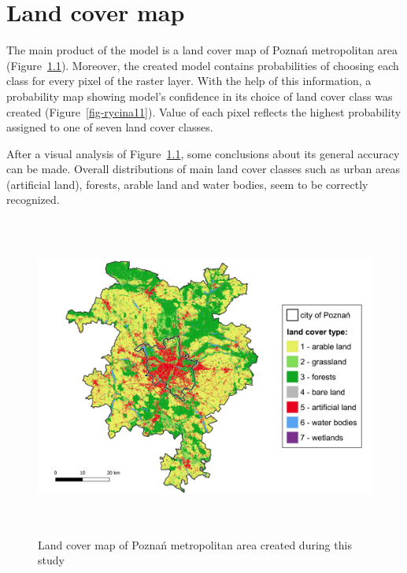 \documentclass{amuthesis}
\begin{document}

\hypertarget{sec-results-map}{%
\chapter{Land cover map}\label{sec-results-map}}

The main product of the model is a land cover map of Poznań metropolitan
area (Figure~\ref{fig-rycina9}). Moreover, the created model contains
probabilities of choosing each class for every pixel of the raster
layer. With the help of this information, a probability map showing
model's confidence in its choice of land cover class was created
(Figure~\ref{fig-rycina11}). Value of each pixel reflects the highest
probability assigned to one of seven land cover classes.

After a visual analysis of Figure~\ref{fig-rycina9}, some conclusions
about its general accuracy can be made. Overall distributions of main
land cover classes such as urban areas (artificial land), forests,
arable land and water bodies, seem to be correctly recognized.

\begin{figure}[H]

{\centering \includegraphics[width=5.875in,height=4.16667in]{./figures/result_map-lc.png}

}

\caption{\label{fig-rycina9}Land cover map of Poznań metropolitan area
created during this study}

\end{figure}
\end{document}
